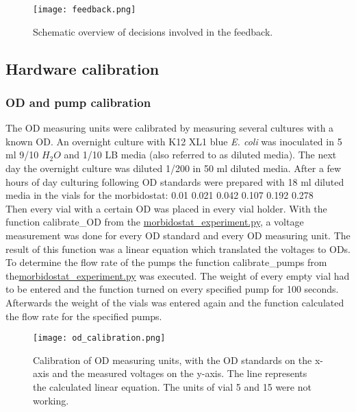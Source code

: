 \begin{figure}
	\texttt{[image: feedback.png]}
	\caption{Schematic overview of decisions involved in the feedback.}
	\label{figure:feedback}
\end{figure}

\subsection{Hardware calibration}
\subsubsection{OD and pump calibration}
The OD measuring units were calibrated by measuring several cultures with a known OD.
An overnight culture with K12 XL1 blue \textit{E. coli} was inoculated in 5 ml 9/10 $H_2O$ and 1/10 LB media (also referred to as diluted media). The next day the overnight culture was diluted 1/200 in 50 ml diluted media. After a few hours of day culturing following OD standards were prepared with 18 ml diluted media in the vials for the morbidostat: 0.01 0.021 0.042 0.107 0.192 0.278\\
Then every vial with a certain OD was placed in every vial holder. With the function calibrate\_OD from the \href{https://github.com/nahanoo/ESBL\_project/}{morbidostat\_experiment.py}, a voltage measurement was done for every OD standard and every OD measuring unit. The result of this function was a linear equation which translated the voltages to ODs. \\
To determine the flow rate of the pumps the function calibrate\_pumps from \newline the\href{https://github.com/nahanoo/ESBL\_project/}{morbidostat\_experiment.py} was executed. The weight of every empty vial had to be entered and the function turned on every specified pump for 100 seconds. Afterwards the weight of the vials was entered again and the function calculated the flow rate for the specified pumps.\begin{figure}
	\texttt{[image: od\_calibration.png]}
	\caption{Calibration of OD measuring units, with the OD standards on the x-axis and the measured voltages on the y-axis. The line represents the calculated linear equation. The units of vial 5 and 15 were not working.}
\end{figure}
 
\label{section:OD_calibration}

